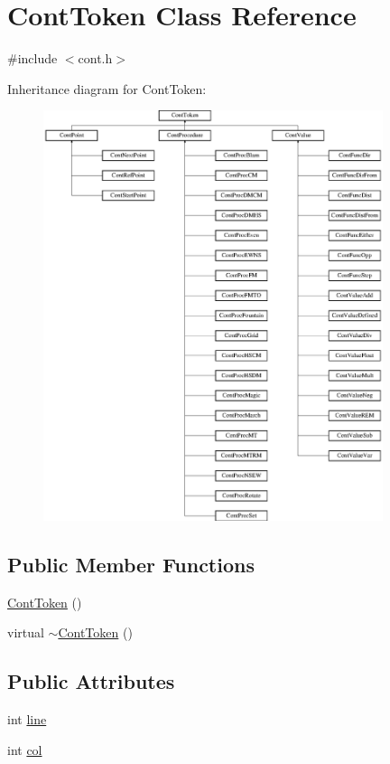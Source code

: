 \hypertarget{a00085}{\section{Cont\-Token Class Reference}
\label{a00085}
}


{\ttfamily \#include $<$cont.\-h$>$}

Inheritance diagram for Cont\-Token\-:\begin{figure}[H]
\begin{center}
\leavevmode
\includegraphics[height=12.000000cm]{a00085}
\end{center}
\end{figure}
\subsection*{Public Member Functions}
\begin{DoxyCompactItemize}
\item 
\hyperlink{a00085_a00ab774bc00762b09c9d28287b22de70}{Cont\-Token} ()
\item 
virtual \hyperlink{a00085_a357c7f80f16a81fd558118a0dcfbda07}{$\sim$\-Cont\-Token} ()
\end{DoxyCompactItemize}
\subsection*{Public Attributes}
\begin{DoxyCompactItemize}
\item 
int \hyperlink{a00085_a72d7f9d34cc245e2ff541af23580ddc8}{line}
\item 
int \hyperlink{a00085_aa80009f27658f23aba95da167495c286}{col}
\end{DoxyCompactItemize}


